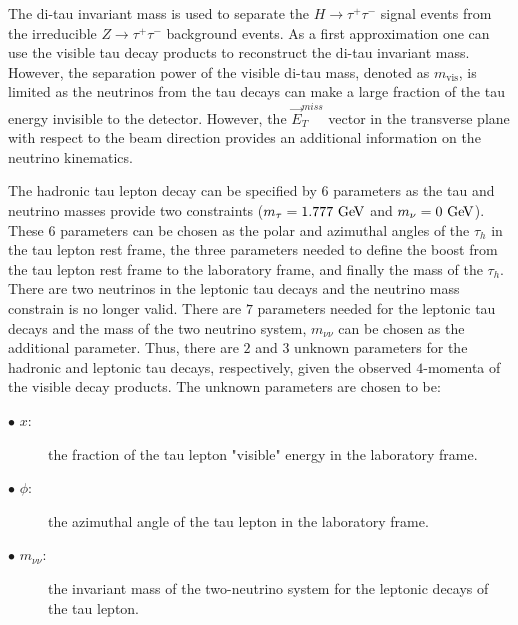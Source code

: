 The di-tau invariant mass is used to separate the $H \rightarrow \tau^{+}\tau^{-}$ signal events from the irreducible $Z\rightarrow\tau^{+}\tau^{-}$ background events. As a first approximation one can use the visible tau decay products to reconstruct the di-tau invariant mass. However, the separation power of the visible di-tau mass, denoted as $m_{\mathrm{vis}}$, is limited as the  neutrinos from the tau decays can make a large fraction of the tau energy invisible to the detector. However, the $\vec{E}_{T}^{miss}$ vector in the transverse plane with respect to the beam direction provides an additional information on the neutrino kinematics. 

The hadronic tau lepton decay can be specified by $6$ parameters as the tau and neutrino masses provide two constraints ($m_{\tau}=1.777~\mathrm{Ge\kern -0.1em V}$ and $m_{\nu}=0~\mathrm{Ge\kern -0.1em V}$). These $6$ parameters can be chosen as the polar and azimuthal angles of the $\tau_h$ in the tau lepton rest frame, the three parameters needed to define the boost from the tau lepton rest frame to the laboratory frame, and finally the  mass of the $\tau_h$. There are two neutrinos in the leptonic tau decays and the neutrino mass constrain is no longer valid. There are $7$ parameters needed for the leptonic tau decays and the mass of the two neutrino system, $m_{\nu\nu}$ can be chosen as the additional parameter.  Thus, there are $2$ and $3$ unknown parameters for the hadronic and leptonic tau decays, respectively, given the observed $4$-momenta of the visible decay products. The unknown parameters are chosen to be:

\begin{description}
\item[$\bullet$ $x$:] the fraction of the tau lepton "visible" energy in the laboratory frame.
\item[$\bullet$ $\phi$:] the azimuthal angle of the tau lepton in the laboratory frame.
\item[$\bullet$ $m_{\nu\nu}$:] the invariant mass of the two-neutrino system for the leptonic decays of the tau lepton. 
\end{description}

